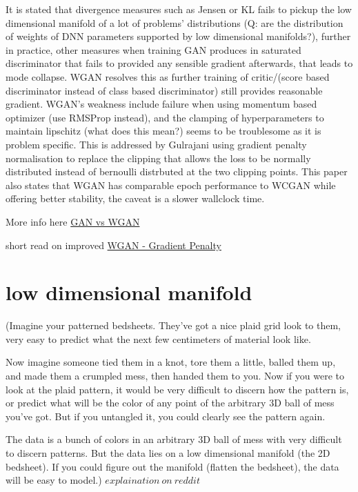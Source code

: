 \documentclass[honours,12pt]{unswthesis}
\numberwithin{equation}{section}
\begin{document}
It is stated that divergence measures such as Jensen or KL fails to pickup the low dimensional manifold of a lot of problems' distributions (Q: are the distribution of weights of DNN parameters supported by low dimensional manifolds?), further in practice, other measures when training GAN produces in saturated discriminator that fails to provided any sensible gradient afterwards, that leads to mode collapse. WGAN resolves this as further training of critic/(score based discriminator instead of class based discriminator) still provides reasonable gradient. WGAN's weakness include failure when using momentum based optimizer (use RMSProp instead), and the clamping of hyperparameters to maintain lipschitz (what does this mean?) seems to be troublesome as it is problem specific. This is addressed by Gulrajani \cite{NIPS2017_WGAN-GP} using gradient penalty normalisation to replace the clipping that allows the loss to be normally distributed instead of bernoulli distrbuted at the two clipping points. This paper also states that WGAN has comparable epoch performance to WCGAN while offering better stability, the caveat is a slower wallclock time. 

More info here \href{https://lilianweng.github.io/lil-log/2017/08/20/from-GAN-to-WGAN.html}{GAN vs WGAN}

short read on improved \href{https://towardsdatascience.com/demystified-wasserstein-gan-with-gradient-penalty-ba5e9b905ead}{WGAN - Gradient Penalty}

\section{low dimensional manifold}
(Imagine your patterned bedsheets. They've got a nice plaid grid look to them, very easy to predict what the next few centimeters of material look like.

Now imagine someone tied them in a knot, tore them a little, balled them up, and made them a crumpled mess, then handed them to you. Now if you were to look at the plaid pattern, it would be very difficult to discern how the pattern is, or predict what will be the color of any point of the arbitrary 3D ball of mess you've got. But if you untangled it, you could clearly see the pattern again.

The data is a bunch of colors in an arbitrary 3D ball of mess with very difficult to discern patterns. But the data lies on a low dimensional manifold (the 2D bedsheet). If you could figure out the manifold (flatten the bedsheet), the data will be easy to model.)  $explaination\ on\ reddit$
\end{document}
